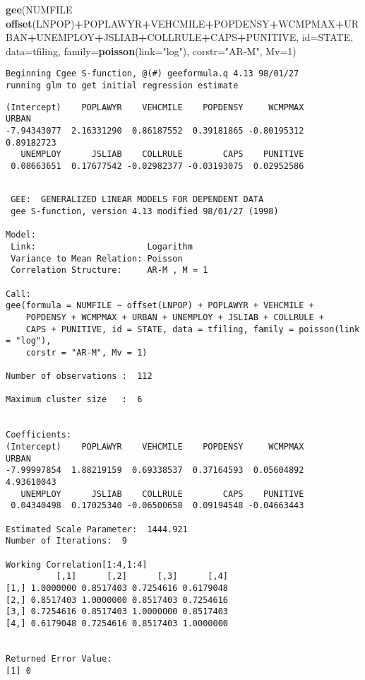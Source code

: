 \documentclass[]{book}
\newenvironment{Shaded}{\begin{snugshade}}{\end{snugshade}}
\newcommand{\DataTypeTok}[1]{\textcolor[rgb]{0.13,0.29,0.53}{#1}}
\newcommand{\DecValTok}[1]{\textcolor[rgb]{0.00,0.00,0.81}{#1}}
\newcommand{\KeywordTok}[1]{\textcolor[rgb]{0.13,0.29,0.53}{\textbf{#1}}}
\newcommand{\NormalTok}[1]{#1}
\newcommand{\OperatorTok}[1]{\textcolor[rgb]{0.81,0.36,0.00}{\textbf{#1}}}
\newcommand{\StringTok}[1]{\textcolor[rgb]{0.31,0.60,0.02}{#1}}
\begin{document}
\begin{Shaded}
\begin{Highlighting}[]
\KeywordTok{gee}\NormalTok{(NUMFILE }\OperatorTok{~}\StringTok{ }\KeywordTok{offset}\NormalTok{(LNPOP)}\OperatorTok{+}\NormalTok{POPLAWYR}\OperatorTok{+}\NormalTok{VEHCMILE}\OperatorTok{+}\NormalTok{POPDENSY}\OperatorTok{+}\NormalTok{WCMPMAX}\OperatorTok{+}\NormalTok{URBAN}\OperatorTok{+}\NormalTok{UNEMPLOY}\OperatorTok{+}\NormalTok{JSLIAB}\OperatorTok{+}\NormalTok{COLLRULE}\OperatorTok{+}\NormalTok{CAPS}\OperatorTok{+}\NormalTok{PUNITIVE, }\DataTypeTok{id=}\NormalTok{STATE, }\DataTypeTok{data=}\NormalTok{tfiling, }\DataTypeTok{family=}\KeywordTok{poisson}\NormalTok{(}\DataTypeTok{link=}\StringTok{"log"}\NormalTok{), }\DataTypeTok{corstr=}\StringTok{"AR-M"}\NormalTok{, }\DataTypeTok{Mv=}\DecValTok{1}\NormalTok{) }
\end{Highlighting}
\end{Shaded}

\begin{verbatim}
Beginning Cgee S-function, @(#) geeformula.q 4.13 98/01/27
running glm to get initial regression estimate
\end{verbatim}

\begin{verbatim}
(Intercept)    POPLAWYR    VEHCMILE    POPDENSY     WCMPMAX       URBAN 
-7.94343077  2.16331290  0.86187552  0.39181865 -0.80195312  0.89182723 
   UNEMPLOY      JSLIAB    COLLRULE        CAPS    PUNITIVE 
 0.08663651  0.17677542 -0.02982377 -0.03193075  0.02952586 
\end{verbatim}

\begin{verbatim}

 GEE:  GENERALIZED LINEAR MODELS FOR DEPENDENT DATA
 gee S-function, version 4.13 modified 98/01/27 (1998) 

Model:
 Link:                      Logarithm 
 Variance to Mean Relation: Poisson 
 Correlation Structure:     AR-M , M = 1 

Call:
gee(formula = NUMFILE ~ offset(LNPOP) + POPLAWYR + VEHCMILE + 
    POPDENSY + WCMPMAX + URBAN + UNEMPLOY + JSLIAB + COLLRULE + 
    CAPS + PUNITIVE, id = STATE, data = tfiling, family = poisson(link = "log"), 
    corstr = "AR-M", Mv = 1)

Number of observations :  112 

Maximum cluster size   :  6 


Coefficients:
(Intercept)    POPLAWYR    VEHCMILE    POPDENSY     WCMPMAX       URBAN 
-7.99997854  1.88219159  0.69338537  0.37164593  0.05604892  4.93610043 
   UNEMPLOY      JSLIAB    COLLRULE        CAPS    PUNITIVE 
 0.04340498  0.17025340 -0.06500658  0.09194548 -0.04663443 

Estimated Scale Parameter:  1444.921
Number of Iterations:  9

Working Correlation[1:4,1:4]
          [,1]      [,2]      [,3]      [,4]
[1,] 1.0000000 0.8517403 0.7254616 0.6179048
[2,] 0.8517403 1.0000000 0.8517403 0.7254616
[3,] 0.7254616 0.8517403 1.0000000 0.8517403
[4,] 0.6179048 0.7254616 0.8517403 1.0000000


Returned Error Value:
[1] 0
\end{verbatim}
\end{document}
